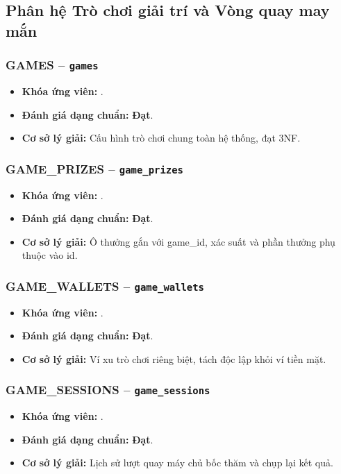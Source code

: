 \subsection{Phân hệ Trò chơi giải trí và Vòng quay may mắn}
\subsubsection{GAMES -- \texttt{games}}
\begin{itemize}
  \item \textbf{Khóa ứng viên:} \texttt{}.
  \item \textbf{Đánh giá dạng chuẩn:} \textbf{Đạt}.
  \item \textbf{Cơ sở lý giải:} Cấu hình trò chơi chung toàn hệ thống, đạt 3NF.
\end{itemize}

\subsubsection{GAME_PRIZES -- \texttt{game\_prizes}}
\begin{itemize}
  \item \textbf{Khóa ứng viên:} \texttt{}.
  \item \textbf{Đánh giá dạng chuẩn:} \textbf{Đạt}.
  \item \textbf{Cơ sở lý giải:} Ô thưởng gắn với game_id, xác suất và phần thưởng phụ thuộc vào id.
\end{itemize}

\subsubsection{GAME_WALLETS -- \texttt{game\_wallets}}
\begin{itemize}
  \item \textbf{Khóa ứng viên:} \texttt{}.
  \item \textbf{Đánh giá dạng chuẩn:} \textbf{Đạt}.
  \item \textbf{Cơ sở lý giải:} Ví xu trò chơi riêng biệt, tách độc lập khỏi ví tiền mặt.
\end{itemize}

\subsubsection{GAME_SESSIONS -- \texttt{game\_sessions}}
\begin{itemize}
  \item \textbf{Khóa ứng viên:} \texttt{}.
  \item \textbf{Đánh giá dạng chuẩn:} \textbf{Đạt}.
  \item \textbf{Cơ sở lý giải:} Lịch sử lượt quay máy chủ bốc thăm và chụp lại kết quả.
\end{itemize}

